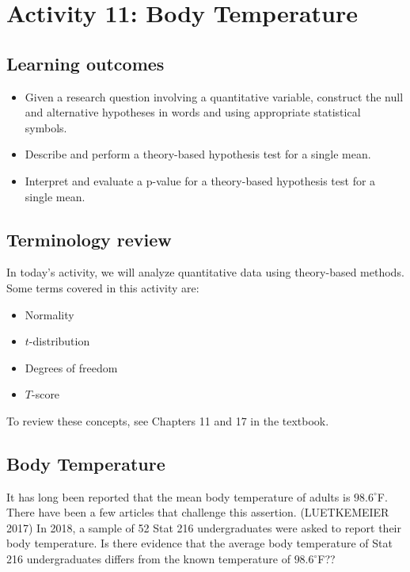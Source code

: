 \documentclass[
]{report}
\begin{document}
\newpage

\section{Activity 11: Body Temperature}\label{activity-11-body-temperature}


\subsection{Learning outcomes}\label{learning-outcomes-11}

\begin{itemize}
\item
  Given a research question involving a quantitative variable, construct the null and alternative hypotheses
  in words and using appropriate statistical symbols.
\item
  Describe and perform a theory-based hypothesis test for a single mean.
\item
  Interpret and evaluate a p-value for a theory-based hypothesis test for a single mean.
\end{itemize}

\subsection{Terminology review}\label{terminology-review-9}

In today's activity, we will analyze quantitative data using theory-based methods. Some terms covered in this activity are:

\begin{itemize}
\item
  Normality
\item
  \(t\)-distribution
\item
  Degrees of freedom
\item
  \(T\)-score
\end{itemize}

To review these concepts, see Chapters 11 and 17 in the textbook.

\subsection{Body Temperature}\label{body-temperature}

It has long been reported that the mean body temperature of adults is \(98.6^{\circ}\)F. There have been a few articles that challenge this assertion. (LUETKEMEIER 2017) In 2018, a sample of 52 Stat 216 undergraduates were asked to report their body temperature. Is there evidence that the average body temperature of Stat 216 undergraduates differs from the known temperature of \(98.6^{\circ}\)F??
\end{document}
